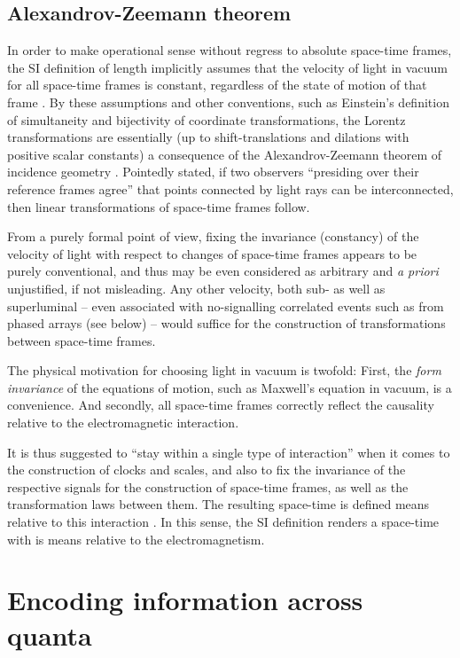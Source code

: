 \documentclass[%
  preprint,
 showpacs,
 showkeys,
 preprintnumbers,
 amsmath,amssymb,
 aps,
  pra,
  longbibliography,
 ]{revtex4-1}
\begin{document}
\subsection{Alexandrov-Zeemann theorem}

In order to make operational sense without regress to absolute space-time frames,
the SI definition of length implicitly assumes that the velocity of light in vacuum for all space-time frames is constant,
regardless of the state of motion of that frame
\cite{peres-84}.
By these assumptions and other conventions, such as Einstein's definition of simultaneity \cite{ein-05} and bijectivity of coordinate transformations,
the Lorentz transformations are essentially (up to shift-translations and
dilations with positive scalar constants) a consequence
of the Alexandrov-Zeemann theorem of incidence geometry \cite{alex3,zeeman,lester,naber}.
Pointedly stated, if two observers ``presiding over their reference frames agree'' \cite{naber} that points connected by
light rays can be interconnected, then linear transformations of space-time frames follow.

From a purely formal point of view,
fixing the invariance (constancy) of the velocity of light with respect to changes of space-time frames
appears to be purely conventional,
and thus may be even considered as arbitrary and {\it a priori} unjustified, if not misleading.
Any other velocity, both sub- as well as superluminal
-- even associated with no-signalling correlated events such as from phased arrays (see below) --
would suffice for the construction of transformations between space-time frames.

The physical motivation for choosing light in vacuum is twofold:
First, the  {\em form invariance}
of the equations of motion, such as Maxwell's equation in vacuum, is a convenience.
And secondly,
all space-time frames correctly reflect the causality relative to the electromagnetic interaction.

It is thus suggested to ``stay within a single type of interaction'' when it comes to the construction of clocks and scales,
and also to fix the invariance of the respective signals for the construction of space-time frames, as well as the transformation laws between them.
The resulting space-time is defined means relative to this interaction \cite{svozil-relrel}.
In this sense, the SI definition renders a space-time with is means relative to the electromagnetism.



\section{Encoding information across quanta}
\end{document}
